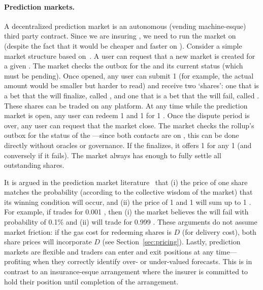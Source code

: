 \paragraph{Prediction markets.} A decentralized prediction market is an autonomous (\eg vending machine-esque) third party contract. Since we are insuring \layerone \ethxx, we need to run the market on \layerone (despite the fact that it would be cheaper and faster on \layertwo). Consider a simple market structure based on~\cite{clark2014decentralizing}. A user can request that a new market is created for a given \rblock. The market checks the outbox for the \rblock and its current status (which must be pending). Once opened, any user can submit 1 \ethone (for example, the actual amount would be smaller but harder to read) and receive two `shares': one that is a bet that the \rblock will finalize, called \final, and one that is a bet that the \rblock will fail, called \fail. These shares can be traded on any platform. At any time while the prediction market is open, any user can redeem 1 \final and 1 \fail for 1 \ethone. Once the dispute period is over, any user can request that the market close. The market checks the rollup's outbox for the status of the \rblock---since both contacts are on \layerone, this can be done directly without oracles or governance. If the \rblock finalizes, it offers 1 \ethone for any 1 \final (and conversely if it fails). The market always has enough \ethone to fully settle all outstanding shares.

It is argued in the prediction market literature~\cite{clark2014decentralizing} that (i) the price of one share matches the probability (according to the collective wisdom of the market) that its winning condition will occur, and (ii) the price of 1 \final and 1 \fail will sum up to 1 \ethone. For example, if \fail trades for 0.001 \ethone, then (i) the market believes the \rblock will fail with probability of 0.1\% and (ii) \final will trade for  0.999 \ethone. These arguments do not assume market friction: if the gas cost for redeeming shares is $D$ (for delivery cost), both share prices will incorporate $D$ (see Section~\ref{sec:pricing}). Lastly, prediction markets are flexible and traders can enter and exit positions at any time---profiting when they correctly identify over- or under-valued forecasts. This is in contrast to an insurance-esque arrangement where the insurer is committed to hold their position until completion of the arrangement.





